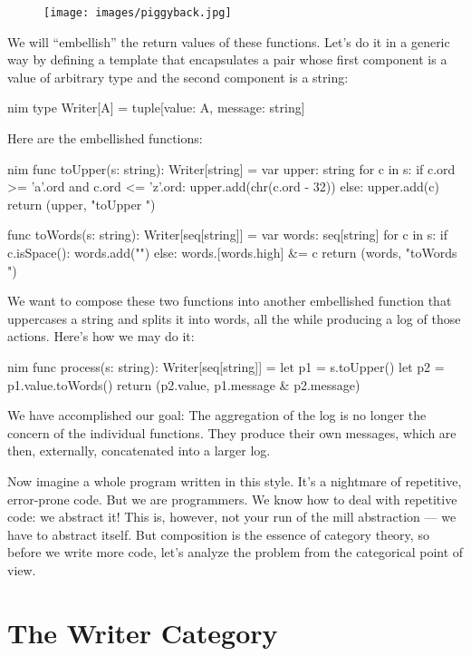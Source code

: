 \begin{figure}[H]
  \centering
  \texttt{[image: images/piggyback.jpg]}
\end{figure}
\noindent
We will ``embellish'' the return values of these functions. Let's do it
in a generic way by defining a template  that
encapsulates a pair whose first component is a value of arbitrary type
 and the second component is a string:

\begin{snip}{nim}
type Writer[A] = tuple[value: A, message: string]
\end{snip}
Here are the embellished functions:

\begin{snip}{nim}
func toUpper(s: string): Writer[string] =
  var upper: string
  for c in s:
    if c.ord >= 'a'.ord and c.ord <= 'z'.ord:
      upper.add(chr(c.ord - 32))
    else:
      upper.add(c)
  return (upper, "toUpper ")

func toWords(s: string): Writer[seq[string]] =
  var words: seq[string]
  for c in s:
    if c.isSpace():
      words.add("")
    else:
      words.[words.high] &= c
  return (words, "toWords ")
\end{snip}
We want to compose these two functions into another embellished function
that uppercases a string and splits it into words, all the while
producing a log of those actions. Here's how we may do it:

\begin{snip}{nim}
func process(s: string): Writer[seq[string]] =
  let p1 = s.toUpper()
  let p2 = p1.value.toWords()
  return (p2.value, p1.message & p2.message)
\end{snip}
We have accomplished our goal: The aggregation of the log is no longer
the concern of the individual functions. They produce their own
messages, which are then, externally, concatenated into a larger log.

Now imagine a whole program written in this style. It's a nightmare of
repetitive, error-prone code. But we are programmers. We know how to
deal with repetitive code: we abstract it! This is, however, not your
run of the mill abstraction --- we have to abstract  itself. But composition is the essence of category theory,
so before we write more code, let's analyze the problem from the
categorical point of view.

\section{The Writer Category}

